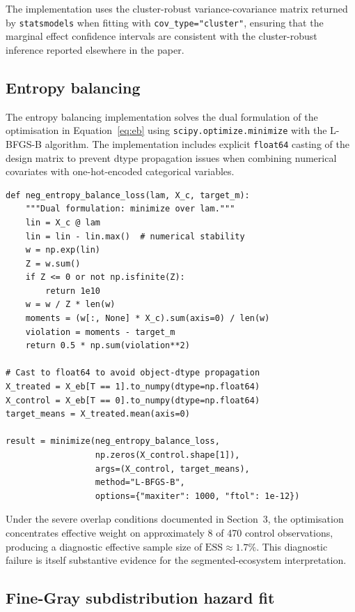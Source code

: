 \documentclass[review,authoryear,11pt]{elsarticle}
\begin{document}
The implementation uses the cluster-robust variance-covariance matrix returned by \texttt{statsmodels} when fitting with \texttt{cov\_type="cluster"}, ensuring that the marginal effect confidence intervals are consistent with the cluster-robust inference reported elsewhere in the paper.

\subsection{Entropy balancing}

The entropy balancing implementation solves the dual formulation of the optimisation in Equation~\ref{eq:eb} using \texttt{scipy.optimize.minimize} with the L-BFGS-B algorithm. The implementation includes explicit \texttt{float64} casting of the design matrix to prevent dtype propagation issues when combining numerical covariates with one-hot-encoded categorical variables.

\begin{lstlisting}[style=python, caption={Entropy balancing dual optimisation.}, label={lst:eb}]
def neg_entropy_balance_loss(lam, X_c, target_m):
    """Dual formulation: minimize over lam."""
    lin = X_c @ lam
    lin = lin - lin.max()  # numerical stability
    w = np.exp(lin)
    Z = w.sum()
    if Z <= 0 or not np.isfinite(Z):
        return 1e10
    w = w / Z * len(w)
    moments = (w[:, None] * X_c).sum(axis=0) / len(w)
    violation = moments - target_m
    return 0.5 * np.sum(violation**2)

# Cast to float64 to avoid object-dtype propagation
X_treated = X_eb[T == 1].to_numpy(dtype=np.float64)
X_control = X_eb[T == 0].to_numpy(dtype=np.float64)
target_means = X_treated.mean(axis=0)

result = minimize(neg_entropy_balance_loss,
                  np.zeros(X_control.shape[1]),
                  args=(X_control, target_means),
                  method="L-BFGS-B",
                  options={"maxiter": 1000, "ftol": 1e-12})
\end{lstlisting}

Under the severe overlap conditions documented in Section~3, the optimisation concentrates effective weight on approximately 8 of 470 control observations, producing a diagnostic effective sample size of $\mathrm{ESS} \approx 1.7\%$. This diagnostic failure is itself substantive evidence for the segmented-ecosystem interpretation.

\subsection{Fine-Gray subdistribution hazard fit}
\end{document}
